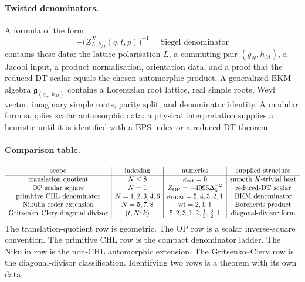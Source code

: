 \paragraph{Twisted denominators.}
A formula of the form
\[
  -\bigl(Z^X_{L,h_M}(q,t,p)\bigr)^{-1}
  =
  \text{Siegel denominator}
\]
contains these data: the lattice polarisation \(L\), a commuting pair
\((g_N,h_M)\), a Jacobi input, a product normalisation, orientation
data, and a proof that the reduced-DT scalar equals the chosen
automorphic product. A generalized BKM algebra
\(\mathfrak g_{(g_N,h_M)}\) contains a Lorentzian root lattice, real
simple roots, Weyl vector, imaginary simple roots, parity split, and
denominator identity. A modular form supplies scalar automorphic data;
a physical interpretation supplies a heuristic until it is identified
with a BPS index or a reduced-DT theorem.

\paragraph{Comparison table.}
\[
\begin{array}{c|c|c|c}
\text{scope} & \text{indexing} & \text{numerics} & \text{supplied structure}\\ \hline
\text{translation quotient} & N\leq8 &
\kappa_{\mathrm{cat}}=0 & \text{smooth }K\text{-trivial host}\\
\text{OP scalar square} & N=1 &
Z_{\mathrm{OP}}=-4096\Delta_5^{-2} & \text{reduced-DT scalar}\\
\text{primitive CHL denominator} & N=1,2,3,4,6 &
\kappa_{\mathrm{BKM}}=5,4,3,2,1 & \text{BKM denominator}\\
\text{Nikulin order extension} & N=5,7,8 &
\operatorname{wt}=2,1,1 & \text{Borcherds product}\\
\text{Gritsenko--Clery diagonal divisor} & (t,N;k) &
5,2,3,1,2,\tfrac12,\tfrac32,1 & \text{diagonal-divisor form}
\end{array}
\]
The translation-quotient row is geometric. The OP row is a scalar
inverse-square convention. The primitive CHL row is the compact
denominator ladder. The Nikulin row is the non-CHL automorphic
extension. The Gritsenko--Clery row is the diagonal-divisor
classification.
Identifying two rows is a theorem with its own data.
